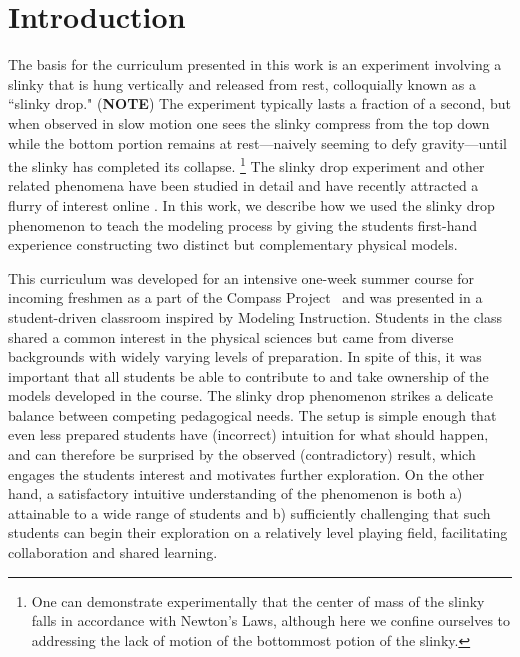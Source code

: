 \documentclass[prb,preprint,superscriptaddress]{revtex4-1}
\newcommand{\NOTEMARG}[1]{\marginpar{\raggedright\scriptsize\textbf{NOTE:} #1} (\textbf{NOTE})}
\begin{document}
\section{Introduction}
The basis for the curriculum presented in this work is an experiment involving a
slinky that is hung vertically and released from rest, colloquially known as a ``slinky drop."
 \NOTEMARG{Add multi-frame figure with labels. (Jesse)}
The experiment typically lasts a fraction of a second, but when observed in slow motion one sees the slinky compress from the top down while the bottom portion remains at rest---naively seeming to defy gravity---until the slinky has completed its collapse. 
\footnote{One can demonstrate experimentally that the center of mass of the slinky falls in accordance with Newton's Laws, although here we confine ourselves to addressing the lack of motion of the bottommost potion of the slinky.}
The slinky drop experiment and other related phenomena have
been studied in detail\cite{calkin1993, newburgh1995, graham2001, aguirregabiria2007,unruh2011, cross2012}
and have recently attracted a flurry of interest online \cite{..}.
In this work, we describe how we used the slinky drop phenomenon to teach the modeling process by giving
 the students first-hand experience constructing two distinct but complementary physical models.

This curriculum was developed for an intensive one-week summer course for
incoming freshmen as a part of the Compass Project~\cite{albana2013,Roth2012,drdf2013a,drdf2013b} and was
presented in a student-driven classroom inspired by Modeling Instruction\cite{hestenes1987}.
Students in the class shared a common interest in the physical sciences but came from diverse backgrounds with widely varying levels of preparation. In spite of this, it was important that all students be able to contribute to and take ownership of the models developed in the course. The slinky drop phenomenon strikes a delicate balance between competing pedagogical needs. The setup is simple enough that even less prepared students have (incorrect) intuition for what should happen, and can therefore be surprised by the observed (contradictory) result, which engages the students interest and motivates further exploration. On the other hand, a satisfactory intuitive %
understanding of the phenomenon is both a) attainable to a wide range of students and b) sufficiently challenging that such students can begin their exploration on a relatively level playing field, facilitating collaboration and shared learning.
\end{document}
